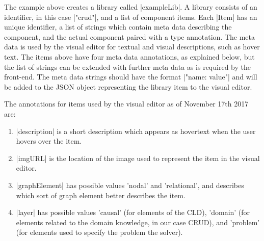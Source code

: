 \documentclass[a4paper]{article}
\begin{document}
The example above creates a library called |exampleLib|. A library consists of
an identifier, in this case |"crud"|, and a list of component items. Each
|Item|
has an unique identifier, a list of strings which contain meta data describing
the component,
and the actual component paired with a type annotation.
The meta data is used by the
visual editor for textual and visual descriptions, such as hover text.
The items above have four meta data annotations, as explained below, but the
list of strings can be extended with further meta data as is required by the
front-end. The meta data strings should have the format |"name: value"|
and will be added to the JSON object representing the library item to the visual
editor.

The annotations for items used by the visual editor as of November 17th 2017 are:
\begin{enumerate}
\item |description| is a short description which appears as hovertext when the
  user hovers over the item.
\item |imgURL| is the location of the image used to represent the item in the
  visual editor.
\item |graphElement| has possible values 'nodal' and 'relational', and describes
which sort of graph element better describes the item. 
\item |layer| has possible values 'causal' (for elements of the CLD),
  'domain' (for elements related to the domain knowledge, in our case CRUD),
  and 'problem' (for elements used to specify the problem the solver). 
\end{enumerate}
\end{document}
